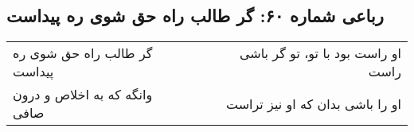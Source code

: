 \begin{center}
\section*{رباعی شماره ۶۰: گر طالب راه حق شوی ره پیداست}
\label{sec:sh060}
\begin{longtable}{l p{0.5cm} r}
گر طالب راه حق شوی ره پیداست
&&
او راست بود با تو، تو گر باشی راست
\\
وانگه که به اخلاص و درون صافی
&&
او را باشی بدان که او نیز تراست
\\
\end{longtable}
\end{center}
